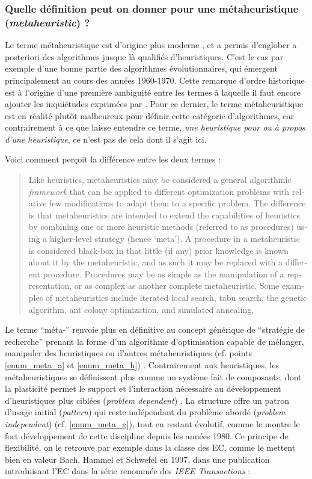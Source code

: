\subsubsection{Quelle définition peut on donner pour une métaheuristique (\textit{metaheuristic}) ?}
\label{sssec:metaheuristique}

Le terme métaheuristique est d'origine plus moderne \autocite{Glover1986}, et a permis d'englober a posteriori des algorithmes jusque là qualifiés d'heuristiques. C'est le cas par exemple d'une bonne partie des algorithmes évolutionnaires, qui émergent principalement au cours des années 1960-1970. Cette remarque d'ordre historique est à l'origine d'une première ambiguité entre les termes à laquelle il faut encore ajouter les inquiétudes exprimées par \textcite{Luke2013}. Pour ce dernier, le terme métaheuristique est en réalité plutôt malheureux pour définir cette catégorie d'algorithmes, car contrairement à ce que laisse entendre ce terme, \textit{une heuristique pour ou à propos d'une heuristique}, ce n'est pas de cela dont il s'agit ici.

Voici comment \textcite[8]{Brownlee2012} perçoit la différence entre les deux termes : \foreignblockquote{english}[{\cite[8]{Brownlee2012}}]{Like heuristics, metaheuristics may be considered a general algorithmic \textit{framework} that can be applied to different optimization problems with relative few modifications to adapt them to a specific problem. The difference is that metaheuristics are intended to extend the capabilities of heuristics by combining one or more heuristic methods (referred to as procedures) using a higher-level strategy (hence ‘meta’). A procedure in a metaheuristic is considered black-box in that little (if any) prior knowledge is known about it by the metaheuristic, and as such it may be replaced with a different procedure. Procedures may be as simple as the manipulation of a representation, or as complex as another complete metaheuristic. Some examples of metaheuristics include iterated local search, tabu search, the genetic algorithm, ant colony optimization, and simulated annealing.}

Le terme \enquote{méta-} renvoie plus en définitive au concept générique de \enquote{stratégie de recherche} prenant la forme d'un algorithme d'optimisation capable de mélanger, manipuler des heuristiques ou d'autres métaheuristiques (cf. points \ref{enum_meta_a} et \ref{enum_meta_h}) . Contrairement aux heuristiques, les métaheuristiques se définissent plus comme un système fait de composants, dont la plasticité permet le support et l'interaction nécessaire au développement d'heuristiques plus ciblées (\textit{problem dependent}) . La structure offre un patron d'usage initial (\textit{pattern}) qui reste indépendant du problème abordé (\textit{problem independent}) (cf. \ref{enum_meta_g}), tout en restant évolutif, comme le montre le fort développement de cette discipline depuis les années 1980. Ce principe de flexibilité, on le retrouve par exemple dans la classe des EC, comme le mettent bien en valeur Bach, Hammel et Schwefel en 1997, dans une publication introduisant l'EC dans la série renommée des \textit{IEEE Transactions} :

